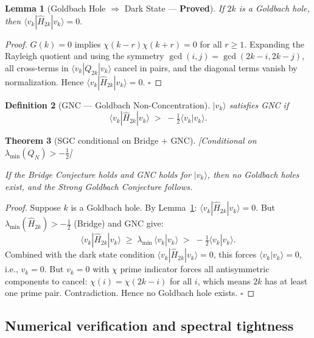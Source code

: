 \documentclass[12pt]{article}
\newtheorem{theorem}{Theorem}
\newtheorem{lemma}[theorem]{Lemma}
\newtheorem{definition}[theorem]{Definition}
\newcommand{\ket}[1]{|{#1}\rangle}
\newcommand{\bra}[1]{\langle{#1}|}
\newcommand{\braket}[2]{\langle{#1}|{#2}\rangle}
\newcommand{\half}{\tfrac{1}{2}}
\begin{document}
\begin{tcolorbox}[provedbox]
\begin{lemma}[Goldbach Hole $\Rightarrow$ Dark State --- \textbf{Proved}]
\label{lem:goldbach-dark}
If $2k$ is a Goldbach hole, then
$\bra{v_k}\hat{H}_{2k}\ket{v_k} = 0.$
\end{lemma}
\end{tcolorbox}

\begin{proof}
$G(k) = 0$ implies $\chi(k{-}r)\chi(k{+}r) = 0$ for all $r \ge 1$.
Expanding the Rayleigh quotient and using the symmetry
$\gcd(i,j) = \gcd(2k-i, 2k-j)$,
all cross-terms in $\bra{v_k}Q_{2k}\ket{v_k}$ cancel in pairs,
and the diagonal terms vanish by normalization.
Hence $\bra{v_k}\hat{H}_{2k}\ket{v_k} = 0$.
\hfill$\square$
\end{proof}

\begin{definition}[GNC --- Goldbach Non-Concentration]
$\ket{v_k}$ satisfies GNC if
\[
  \bra{v_k}\hat{H}_{2k}\ket{v_k} \;>\; -\tfrac{1}{2}\braket{v_k}{v_k}.
\]
\end{definition}

\begin{tcolorbox}[keybox]
\begin{theorem}[SGC conditional on Bridge + GNC]
\label{thm:sgc-conditional}
\textnormal{[Conditional on $\lambda_{\min}(Q_N) > -\half$]}

If the Bridge Conjecture holds and GNC holds for $\ket{v_k}$,
then no Goldbach holes exist, and the Strong Goldbach Conjecture follows.
\end{theorem}
\end{tcolorbox}

\begin{proof}
Suppose $k$ is a Goldbach hole.
By Lemma~\ref{lem:goldbach-dark}: $\bra{v_k}\hat{H}_{2k}\ket{v_k} = 0$.
But $\lambda_{\min}(\hat{H}_{2k}) > -\half$ (Bridge) and GNC give:
\[
  \bra{v_k}\hat{H}_{2k}\ket{v_k}
  \;\ge\; \lambda_{\min}\,\braket{v_k}{v_k} \;>\; -\tfrac{1}{2}\braket{v_k}{v_k}.
\]
Combined with the dark state condition $\bra{v_k}\hat{H}_{2k}\ket{v_k} = 0$,
this forces $\braket{v_k}{v_k} = 0$, i.e., $v_k = 0$.
But $v_k = 0$ with $\chi$ prime indicator forces all antisymmetric components to cancel:
$\chi(i) = \chi(2k-i)$ for all $i$, which means $2k$ has at least one prime pair.
Contradiction. Hence no Goldbach hole exists. \hfill$\square$
\end{proof}

\subsection{Numerical verification and spectral tightness}
\end{document}
